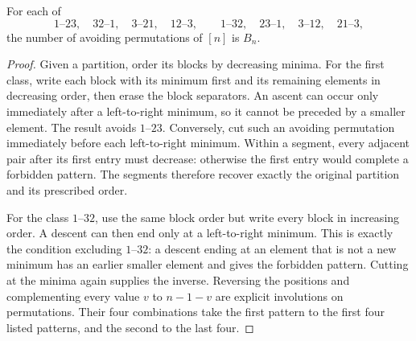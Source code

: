 \begin{proposition}\label{prop:pattern-avoidance}
For each of
\[
 1\text{--}23,\quad32\text{--}1,\quad3\text{--}21,\quad12\text{--}3,
 \qquad
 1\text{--}32,\quad23\text{--}1,\quad3\text{--}12,\quad21\text{--}3,
\]
the number of avoiding permutations of $[n]$ is $B_n$.
\end{proposition}
\begin{proof}
Given a partition, order its blocks by decreasing minima. For the first
class, write each block with its minimum first and its remaining elements in
decreasing order, then erase the block separators. An ascent can occur only
immediately after a left-to-right minimum, so it cannot be preceded by a
smaller element. The result avoids $1$--$23$. Conversely, cut such an avoiding
permutation immediately before each left-to-right minimum. Within a segment,
every adjacent pair after its first entry must decrease: otherwise the first
entry would complete a forbidden pattern. The segments therefore recover
exactly the original partition and its prescribed order.

For the class $1$--$32$, use the same block order but write every block in
increasing order. A descent can then end only at a left-to-right minimum.
This is exactly the condition excluding $1$--$32$: a descent ending at an
element that is not a new minimum has an earlier smaller element and gives
the forbidden pattern. Cutting at the minima again supplies the inverse.
Reversing the positions and complementing every value $v$ to $n-1-v$ are
explicit involutions on permutations. Their four combinations take the first
pattern to the first four listed patterns, and the second to the last four.
\end{proof}

